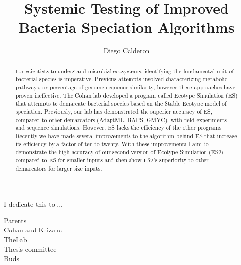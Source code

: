 \documentclass[11pt, final]{westhesis}
\title{Systemic Testing of Improved Bacteria Speciation Algorithms}
\author{Diego Calderon}
\begin{document}

\begin{dedication}
I dedicate this to ...
\end{dedication}

\begin{acknowledgements}
Parents \\
Cohan and Krizanc \\
TheLab \\
Thesis committee \\
Buds \\
%
\end{acknowledgements}

\begin{abstract}
For scientists to understand microbial ecosystems, identifying the fundamental unit of bacterial species is imperative.
Previous attempts involved characterizing metabolic pathways, or percentage of genome sequence similarity, however these approaches have proven ineffective.
The Cohan lab developed a program called Ecotype Simulation (ES) that attempts to demarcate bacterial species based on the Stable Ecotype model of speciation.
Previously, our lab has demonstrated the superior accuracy of ES, compared to other demarcators (AdaptML, BAPS, GMYC), with field experiments and sequence simulations.
However, ES lacks the efficiency of the other programs.
Recently we have made several improvements to the algorithm behind ES that increase its efficiency by a factor of ten to twenty.
With these improvements I aim to demonstrate the high accuracy of our second version of Ecotype Simulation (ES2) compared to ES for smaller inputs and then show ES2's superiority to other demarcators for larger size inputs.

\end{abstract}

\frontmatter
\maketitle
\makeack
\makeabstract
\tableofcontents
\listoffigures
\listoftables
\end{document}
